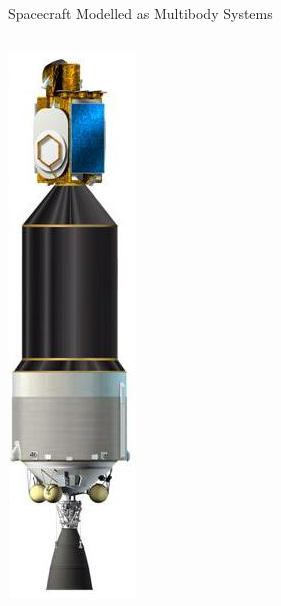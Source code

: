 \documentclass{beamer}
\begin{document}
\begin{frame}{Spacecraft Modelled as Multibody Systems}
\begin{columns}
\includegraphics[width=\textwidth]{images/esca.png}

\end{columns}
\end{frame}
\end{document}
